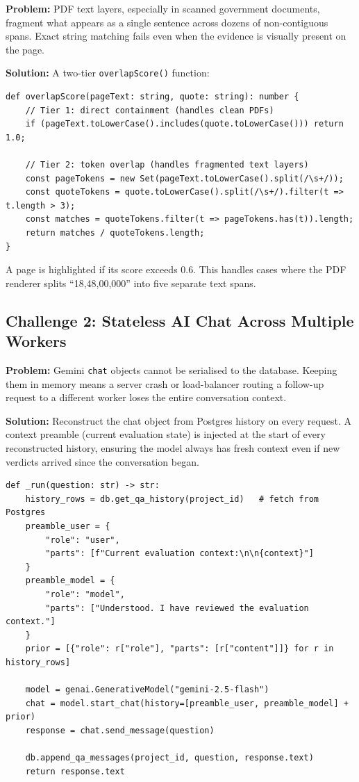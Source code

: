 \documentclass[12pt,a4paper]{article}
\begin{document}
\textbf{Problem:} PDF text layers, especially in scanned government documents,
fragment what appears as a single sentence across dozens of non-contiguous spans.
Exact string matching fails even when the evidence is visually present on the page.

\textbf{Solution:} A two-tier \texttt{overlapScore()} function:

\begin{lstlisting}[style=pythonstyle, caption={Two-tier overlap scoring for PDF highlighting}]
def overlapScore(pageText: string, quote: string): number {
    // Tier 1: direct containment (handles clean PDFs)
    if (pageText.toLowerCase().includes(quote.toLowerCase())) return 1.0;

    // Tier 2: token overlap (handles fragmented text layers)
    const pageTokens = new Set(pageText.toLowerCase().split(/\s+/));
    const quoteTokens = quote.toLowerCase().split(/\s+/).filter(t => t.length > 3);
    const matches = quoteTokens.filter(t => pageTokens.has(t)).length;
    return matches / quoteTokens.length;
}
\end{lstlisting}

A page is highlighted if its score exceeds 0.6. This handles cases where the
PDF renderer splits \enquote{18,48,00,000} into five separate text spans.

\subsection{Challenge 2: Stateless AI Chat Across Multiple Workers}

\textbf{Problem:} Gemini \texttt{chat} objects cannot be serialised to the database.
Keeping them in memory means a server crash or load-balancer routing a follow-up
request to a different worker loses the entire conversation context.

\textbf{Solution:} Reconstruct the chat object from Postgres history on every request.
A context preamble (current evaluation state) is injected at the start of every
reconstructed history, ensuring the model always has fresh context even if new
verdicts arrived since the conversation began.

\begin{lstlisting}[style=pythonstyle, caption={Stateless Gemini chat reconstruction}]
def _run(question: str) -> str:
    history_rows = db.get_qa_history(project_id)   # fetch from Postgres
    preamble_user = {
        "role": "user",
        "parts": [f"Current evaluation context:\n\n{context}"]
    }
    preamble_model = {
        "role": "model",
        "parts": ["Understood. I have reviewed the evaluation context."]
    }
    prior = [{"role": r["role"], "parts": [r["content"]]} for r in history_rows]

    model = genai.GenerativeModel("gemini-2.5-flash")
    chat = model.start_chat(history=[preamble_user, preamble_model] + prior)
    response = chat.send_message(question)

    db.append_qa_messages(project_id, question, response.text)
    return response.text
\end{lstlisting}
\end{document}
